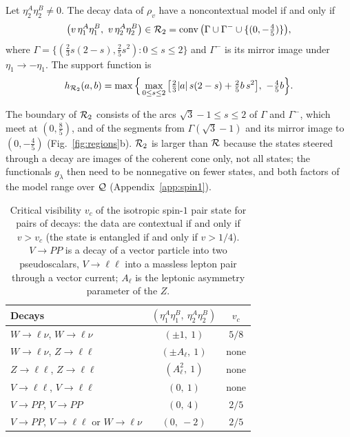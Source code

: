 \begin{theorem}
\label{thm:onepair}
Let $\eta_2^A\eta_2^B\ne0$. The decay data of $\rho_v$ have a noncontextual model if and only if
\begin{equation}
\big(v\,\eta_1^A\eta_1^B,\ v\,\eta_2^A\eta_2^B\big)\in\cR_2=\conv\big(\Gamma\cup\Gamma^-\cup\{(0,-\tfrac45)\}\big),
\label{eq:R2}
\end{equation}
where $\Gamma=\{(\tfrac23s(2-s),\tfrac25s^2):0\le s\le2\}$ and $\Gamma^-$ is its mirror image under $\eta_1\to-\eta_1$. The support function is
\begin{equation}
h_{\mathcal{R}_2}(a,b)=\max\Big\{\max_{0\le s\le2}\big[\tfrac23|a|\,s(2-s)+\tfrac25b\,s^2\big],\ -\tfrac45b\Big\}.
\label{eq:hR2}
\end{equation}
\end{theorem}

The boundary of $\mathcal{R}_2$ consists of the arcs $\sqrt3-1\le s\le2$ of $\Gamma$ and $\Gamma^-$, which meet at $(0,\tfrac85)$, and of the segments from $\Gamma(\sqrt3-1)$ and its mirror image to $(0,-\tfrac45)$ (Fig.~\ref{fig:regions}b). $\mathcal{R}_2$ is larger than $\mathcal{R}$ because the states steered through a decay are images of the coherent cone only, not all states; the functionals $g_\lambda$ then need to be nonnegative on fewer states, and both factors of the model range over $\mathcal{Q}$ (Appendix~\ref{app:spin1}).

\begin{table}[t]
\caption{Critical visibility $v_c$ of the isotropic spin-$1$ pair state for pairs of decays: the data are contextual if and only if $v>v_c$ (the state is entangled if and only if $v>1/4$). $V\to PP$ is a decay of a vector particle into two pseudoscalars, $V\to\ell\ell$ into a massless lepton pair through a vector current; $A_\ell$ is the leptonic asymmetry parameter of the $Z$.}
\label{tab:pairs}
\begin{ruledtabular}
\begin{tabular}{lcc}
Decays & $(\eta_1^A\eta_1^B,\ \eta_2^A\eta_2^B)$ & $v_c$\\
\hline
$W\to\ell\nu$, $W\to\ell\nu$ & $(\pm1,\ 1)$ & $5/8$\\
$W\to\ell\nu$, $Z\to\ell\ell$ & $(\pm A_\ell,\ 1)$ & none\\
$Z\to\ell\ell$, $Z\to\ell\ell$ & $(A_\ell^2,\ 1)$ & none\\
$V\to\ell\ell$, $V\to\ell\ell$ & $(0,\ 1)$ & none\\
$V\to PP$, $V\to PP$ & $(0,\ 4)$ & $2/5$\\
$V\to PP$, $V\to\ell\ell$ or $W\to\ell\nu$ & $(0,\ -2)$ & $2/5$\\
\end{tabular}
\end{ruledtabular}
\end{table}


